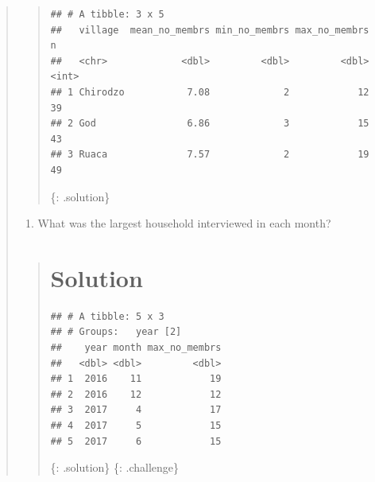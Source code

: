 \documentclass[]{book}
\newenvironment{Shaded}{\begin{snugshade}}{\end{snugshade}}
\newcommand{\KeywordTok}[1]{\textcolor[rgb]{0.13,0.29,0.53}{\textbf{#1}}}
\newcommand{\DataTypeTok}[1]{\textcolor[rgb]{0.13,0.29,0.53}{#1}}
\newcommand{\StringTok}[1]{\textcolor[rgb]{0.31,0.60,0.02}{#1}}
\newcommand{\CommentTok}[1]{\textcolor[rgb]{0.56,0.35,0.01}{\textit{#1}}}
\newcommand{\OperatorTok}[1]{\textcolor[rgb]{0.81,0.36,0.00}{\textbf{#1}}}
\newcommand{\NormalTok}[1]{#1}
\providecommand{\tightlist}{%
  \setlength{\itemsep}{0pt}\setlength{\parskip}{0pt}}
\begin{document}
\begin{quote}
\begin{quote}
\begin{verbatim}
## # A tibble: 3 x 5
##   village  mean_no_membrs min_no_membrs max_no_membrs     n
##   <chr>             <dbl>         <dbl>         <dbl> <int>
## 1 Chirodzo           7.08             2            12    39
## 2 God                6.86             3            15    43
## 3 Ruaca              7.57             2            19    49
\end{verbatim}

\{: .solution\}
\end{quote}

\begin{enumerate}
\def\labelenumi{\arabic{enumi}.}
\setcounter{enumi}{2}
\tightlist
\item
  What was the largest household interviewed in each month?
\end{enumerate}

\begin{quote}
\section{Solution}\label{solution-13}

\begin{Shaded}
\end{Shaded}

\begin{verbatim}
## # A tibble: 5 x 3
## # Groups:   year [2]
##    year month max_no_membrs
##   <dbl> <dbl>         <dbl>
## 1  2016    11            19
## 2  2016    12            12
## 3  2017     4            17
## 4  2017     5            15
## 5  2017     6            15
\end{verbatim}

\{: .solution\} \{: .challenge\}
\end{quote}
\end{quote}
\end{document}
